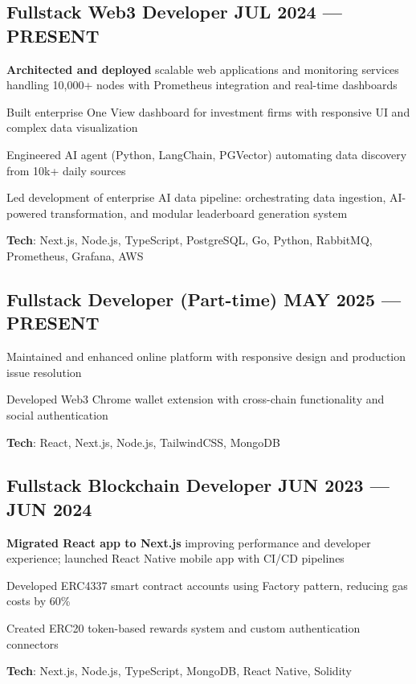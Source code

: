 \documentclass[letter,10pt]{article}
\begin{document}
\subsection{{Fullstack Web3 Developer \hfill JUL 2024 --- PRESENT}}
\begin{zitemize}
  \item \textbf{Architected and deployed} scalable web applications and monitoring services handling 10,000+ nodes with Prometheus integration and real-time dashboards
  \item Built enterprise One View dashboard for investment firms with responsive UI and complex data visualization
  \item Engineered AI agent (Python, LangChain, PGVector) automating data discovery from 10k+ daily sources
  \item Led development of enterprise AI data pipeline: orchestrating data ingestion, AI-powered transformation, and modular leaderboard generation system
  \item \textbf{Tech}: Next.js, Node.js, TypeScript, PostgreSQL, Go, Python, RabbitMQ, Prometheus, Grafana, AWS
\end{zitemize}


\subsection{{Fullstack Developer (Part-time) \hfill MAY 2025 --- PRESENT}}
\begin{zitemize}
  \item Maintained and enhanced online platform with responsive design and production issue resolution
  \item Developed Web3 Chrome wallet extension with cross-chain functionality and social authentication
  \item \textbf{Tech}: React, Next.js, Node.js, TailwindCSS, MongoDB
\end{zitemize}



\subsection{{ Fullstack Blockchain Developer \hfill JUN 2023 --- JUN 2024}}
\begin{zitemize}
  \item \textbf{Migrated React app to Next.js} improving performance and developer experience; launched React Native mobile app with CI/CD pipelines
  \item Developed ERC4337 smart contract accounts using Factory pattern, reducing gas costs by 60\%
  \item Created ERC20 token-based rewards system and custom authentication connectors
  \item \textbf{Tech}: Next.js, Node.js, TypeScript, MongoDB, React Native, Solidity
\end{zitemize}
\end{document}
